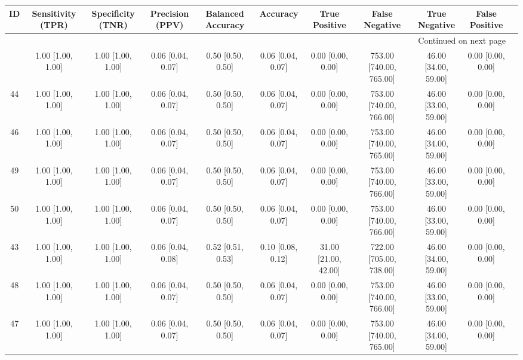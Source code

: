 \documentclass[8pt]{article}
\begin{document}
\begin{center}
\begin{footnotesize}
\begin{longtable}{|ccccccccccc|}
\toprule
 ID &  Sensitivity (TPR) &  Specificity (TNR) &    Precision (PPV) &  Balanced Accuracy &           Accuracy &            True Positive &           False Negative &         True Negative &        False Positive \\
\midrule
\endhead
\midrule
\multicolumn{10}{r}{{Continued on next page}} \\
\midrule
\endfoot

\bottomrule
\endlastfoot
 45 &  1.00 [1.00, 1.00] &  1.00 [1.00, 1.00] &  0.06 [0.04, 0.07] &  0.50 [0.50, 0.50] &  0.06 [0.04, 0.07] &        0.00 [0.00, 0.00] &  753.00 [740.00, 765.00] &  46.00 [34.00, 59.00] &     0.00 [0.00, 0.00] \\
 44 &  1.00 [1.00, 1.00] &  1.00 [1.00, 1.00] &  0.06 [0.04, 0.07] &  0.50 [0.50, 0.50] &  0.06 [0.04, 0.07] &        0.00 [0.00, 0.00] &  753.00 [740.00, 766.00] &  46.00 [33.00, 59.00] &     0.00 [0.00, 0.00] \\
 46 &  1.00 [1.00, 1.00] &  1.00 [1.00, 1.00] &  0.06 [0.04, 0.07] &  0.50 [0.50, 0.50] &  0.06 [0.04, 0.07] &        0.00 [0.00, 0.00] &  753.00 [740.00, 765.00] &  46.00 [34.00, 59.00] &     0.00 [0.00, 0.00] \\
 49 &  1.00 [1.00, 1.00] &  1.00 [1.00, 1.00] &  0.06 [0.04, 0.07] &  0.50 [0.50, 0.50] &  0.06 [0.04, 0.07] &        0.00 [0.00, 0.00] &  753.00 [740.00, 766.00] &  46.00 [33.00, 59.00] &     0.00 [0.00, 0.00] \\
 50 &  1.00 [1.00, 1.00] &  1.00 [1.00, 1.00] &  0.06 [0.04, 0.07] &  0.50 [0.50, 0.50] &  0.06 [0.04, 0.07] &        0.00 [0.00, 0.00] &  753.00 [740.00, 766.00] &  46.00 [33.00, 59.00] &     0.00 [0.00, 0.00] \\
 43 &  1.00 [1.00, 1.00] &  1.00 [1.00, 1.00] &  0.06 [0.04, 0.08] &  0.52 [0.51, 0.53] &  0.10 [0.08, 0.12] &     31.00 [21.00, 42.00] &  722.00 [705.00, 738.00] &  46.00 [34.00, 59.00] &     0.00 [0.00, 0.00] \\
 48 &  1.00 [1.00, 1.00] &  1.00 [1.00, 1.00] &  0.06 [0.04, 0.07] &  0.50 [0.50, 0.50] &  0.06 [0.04, 0.07] &        0.00 [0.00, 0.00] &  753.00 [740.00, 766.00] &  46.00 [33.00, 59.00] &     0.00 [0.00, 0.00] \\
 47 &  1.00 [1.00, 1.00] &  1.00 [1.00, 1.00] &  0.06 [0.04, 0.07] &  0.50 [0.50, 0.50] &  0.06 [0.04, 0.07] &        0.00 [0.00, 0.00] &  753.00 [740.00, 765.00] &  46.00 [34.00, 59.00] &     0.00 [0.00, 0.00] \\

\end{longtable}
\end{footnotesize}
\end{center}
\end{document}

